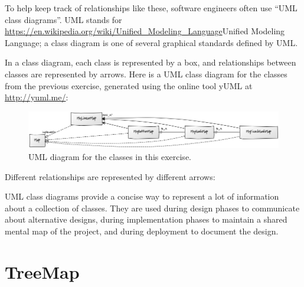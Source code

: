 \documentclass[12pt]{book}
\theoremstyle{exercise}
\newcommand{\java}{\verb}%}
\begin{document}
{{{To help keep track of relationships like these, software engineers often
use ``UML class diagrams''. UML stands for
\url{https://en.wikipedia.org/wiki/Unified_Modeling_Language}{Unified
Modeling Language}; a class diagram is one of several graphical
standards defined by UML.

In a class diagram, each class is represented by a box, and
relationships between classes are represented by arrows. Here is a UML
class diagram for the classes from the previous exercise,
generated using the online tool yUML at 
\url{http://yuml.me/}:

\begin{figure}
\centering
\includegraphics[width=5in]{figs/yuml1.png}
\caption{UML diagram for the classes in this exercise.}
\end{figure}

Different relationships are represented by different arrows:


UML class diagrams provide a concise way to represent a lot of
information about a collection of classes. They are used during design
phases to communicate about alternative designs, during implementation
phases to maintain a shared mental map of the project, and during
deployment to document the design.


\section{TreeMap}

}}}
\end{document}
